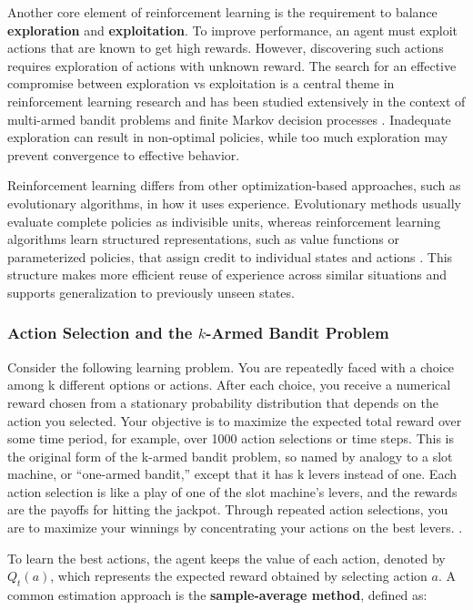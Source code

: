 Another core element of reinforcement learning is the requirement to balance \textbf{exploration} and \textbf{exploitation}. To improve performance, an agent must exploit actions that are known to get high rewards. However, discovering such actions requires exploration of actions with unknown reward. The search for an effective compromise between exploration vs exploitation is a central theme in reinforcement learning research and has been studied extensively in the context of multi-armed bandit problems and finite Markov decision processes \cite{burnetas1997}. Inadequate exploration can result in non-optimal policies, while too much exploration may prevent convergence to effective behavior.

Reinforcement learning differs from other optimization-based approaches, such as evolutionary algorithms, in how it uses experience. Evolutionary methods usually evaluate complete policies as indivisible units, whereas reinforcement learning algorithms learn structured representations, such as value functions or parameterized policies, that assign credit to individual states and actions \cite{sutton}. This structure makes more efficient reuse of experience across similar situations and supports generalization to previously unseen states.


\subsubsection{Action Selection and the $k$-Armed Bandit Problem}


Consider the following learning problem. You are repeatedly faced with a choice among k different options or actions. After each choice, you receive a numerical reward chosen from a stationary probability distribution that depends on the action you selected. Your objective is to maximize the expected total reward over some time period, for example, over 1000 action selections or time steps. This is the original form of the k-armed bandit problem, so named by analogy to a slot machine, or “one-armed bandit,” except that it has k levers instead of one. Each action selection is like a play of one of the slot machine’s levers, and the rewards are the payoffs for hitting the jackpot. Through repeated action selections, you are to maximize your winnings by concentrating your actions on the best levers. \cite{sutton}.


To learn the best actions, the agent keeps the value of each action, denoted by $Q_t(a)$, which represents the expected reward obtained by selecting action $a$. A common estimation approach is the \textbf{sample-average method}, defined as:

